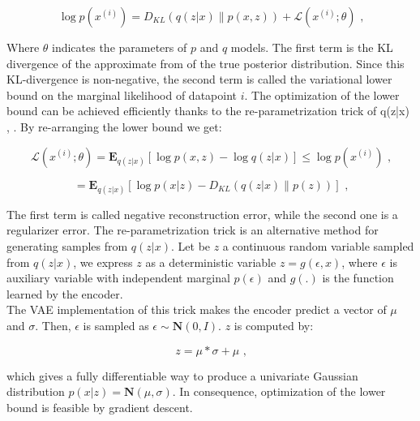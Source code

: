 \documentclass[a4paper]{article}
\begin{document}
\begin{equation}
\log{p(x^{(i)})} = D_{KL}(q(z|x)\parallel p(x,z))+\mathcal{L}(x^{(i)};\theta) \mbox{ ,}
\label{equation_log_likelihood}
\end{equation}

Where $\theta$ indicates the parameters of $p$ and $q$ models. The first term is the KL divergence of the approximate from of the true posterior distribution.  Since this KL-divergence is non-negative, the second term is called the variational lower bound on the marginal likelihood of datapoint $i$.
The optimization of the lower bound can be achieved efficiently thanks to the re-parametrization trick of q(z|x) \cite{Kingma13}, \cite{Rezende14}. By re-arranging the lower bound we get:

\begin{equation}
\mathcal{L}(x^{(i)};\theta) = \mathbf{E}_{q(z|x)}[\log{p(x,z)}- \log{q(z|x)}] \leq \log{p(x^{(i)})} \mbox{ ,}
\label{equation_lower_bound}
\end{equation}

\begin{equation}
 = \mathbf{E}_{q(z|x)}[\log{p(x|z)}- D_{KL}(q(z|x)\parallel p(z))] \mbox{ ,}
\label{equation_lower_bound2}
\end{equation}

The first term is called negative reconstruction error, while the second one is a regularizer error.
The re-parametrization trick is an alternative method for generating samples from $q(z|x)$. Let be $z$ a continuous random variable sampled from $q(z|x)$, we express $z$ as a deterministic variable $z=g(\epsilon, x)$, where $\epsilon$ is auxiliary variable with independent marginal $p(\epsilon)$ and $g(.)$ is the function learned by the encoder.\\
The VAE implementation of this trick makes the encoder predict a vector of $\mu$ and $\sigma$. Then, $\epsilon$ is sampled as $\epsilon \sim \mathbf{N}(0,I)$. $z$ is computed by:

\begin{equation}
 z = \mu * \sigma + \mu \mbox{ ,}
\label{equation_reparametrization_trick}
\end{equation}

which gives a fully differentiable way to produce a univariate Gaussian distribution $p(x|z)=\mathbf{N}(\mu,\sigma)$. In consequence, optimization of the lower bound is feasible by gradient descent.
\end{document}
